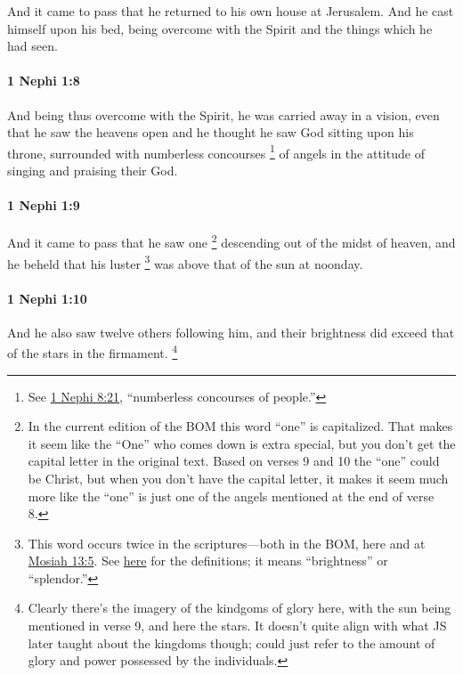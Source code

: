 			And it came to pass that he returned to his own house at Jerusalem.
			And he cast himself upon his bed,
			being overcome with the Spirit and the things which he had seen.

		\paragraph{1 Nephi 1:8} %
			\label{1NEPHI-1-8}

			And being thus overcome with the Spirit,
			he was carried away in a vision,
			even that he saw the heavens open
			and he thought he saw God sitting upon his throne,
			surrounded with numberless concourses%
				\footnote{%
					See \hyperref[1NEPHI-8-21]{1 Nephi 8:21}, ``numberless concourses of people.''
					}
			of angels
			in the attitude of singing and praising their God.

		\paragraph{1 Nephi 1:9} %
			\label{1NEPHI-1-9}

			And it came to pass that he saw one%
			\footnote{%
				\label{1NEPHI-1-9-NOTE-one}%
				In the current edition of the BOM this word ``one'' is capitalized. That makes it seem like the ``One'' who comes down is extra special, but you don't get the capital letter in the original text. Based on verses 9 and 10 the ``one'' could be Christ, but when you don't have the capital letter, it makes it seem much more like the ``one'' is just one of the angels mentioned at the end of verse 8.
				}
			descending out of the midst of heaven,
			and he beheld that his luster%
				\footnote{%
					This word occurs twice in the scriptures---both in the BOM, here and at \hyperref[MOSIAH-13-5]{Mosiah 13:5}. See \hyperref[LUSTER]{here} for the definitions; it means ``brightness'' or ``splendor.''
					}
			was above that of the sun at noonday.

		\paragraph{1 Nephi 1:10} %
			\label{1NEPHI-1-10}

			And he also saw twelve others following him,
			and their brightness did exceed that of the stars in the firmament.%
				\footnote{%
					Clearly there's the imagery of the kindgoms of glory here, with the sun being mentioned in verse 9, and here the stars. It doesn't quite align with what JS later taught about the kingdoms though; could just refer to the amount of glory and power possessed by the individuals.
					}

